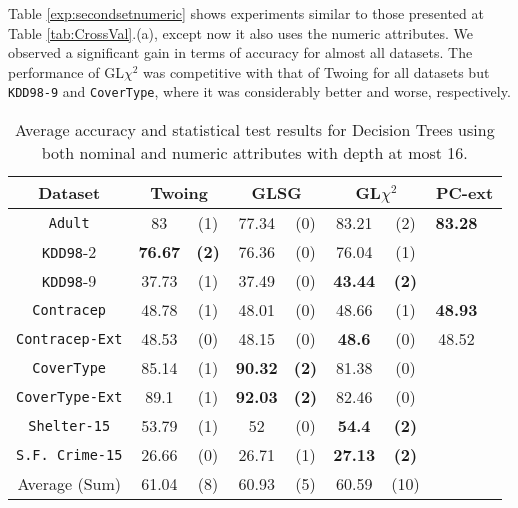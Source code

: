 Table \ref{exp:secondsetnumeric}
shows experiments  similar to those presented at Table \ref{tab:CrossVal}.(a), except now it also uses the numeric attributes.
We observed a significant gain in terms of accuracy for almost all datasets. 
The performance of GL$\chi^2$ was competitive with that of Twoing for all datasets but {\tt KDD98-9} and {\tt CoverType}, where it was
considerably better and worse, respectively.


\begin{table}
\small
\caption{Average accuracy and statistical test results for  Decision Trees using both nominal and numeric attributes with depth at most 16.}
\centering
\begin{tabular}{c|cc|cc|cc|cc} 
Dataset              &        \multicolumn{2}{c|}{Twoing} &   \multicolumn{2}{c|}{GLSG} &   \multicolumn{2}{c|}{GL$\chi^2$} & \multicolumn{2}{c}{PC-ext}  \\  \hline   
{\tt Adult}          &  83            &  (1)              &  77.34      &  (0)          &  83.21       &  (2)               & {\bf 83.28} &               \\
{\tt KDD98}-2        &  {\bf 76.67}   &  {\bf (2)}        &  76.36      &  (0)          &  76.04       &  (1)               &             &               \\
{\tt KDD98}-9        &  37.73         &  (1)              &  37.49      &  (0)          &  {\bf 43.44} &  {\bf (2)}         &             &               \\
{\tt Contracep}      &  48.78         &  (1)              &  48.01      &  (0)          &  48.66       &  (1)               & {\bf 48.93} &               \\
{\tt Contracep-Ext}  &  48.53         &  (0)              &  48.15      &  (0)          &  {\bf 48.6}  &  (0)               &  48.52      &               \\
{\tt CoverType}      &  85.14         &  (1)              &  {\bf 90.32}&  {\bf (2)}    &  81.38       &  (0)               &             &               \\
{\tt CoverType-Ext}  &  89.1          &  (1)              &  {\bf 92.03}&  {\bf (2)}    &  82.46       &  (0)               &             &               \\
{\tt Shelter-15}     &  53.79         &  (1)              &  52         &  (0)          &  {\bf 54.4}  &  {\bf (2)}         &             &               \\   
{\tt S.F. Crime-15}  &  26.66         &  (0)              &  26.71      &  (1)          &  {\bf 27.13} &  {\bf (2)}         &             &               \\
\hline
Average (Sum)        &   61.04        &  (8)              & 60.93       & (5)           &   60.59      & (10)               &             &


\end{tabular}
\end{table}
